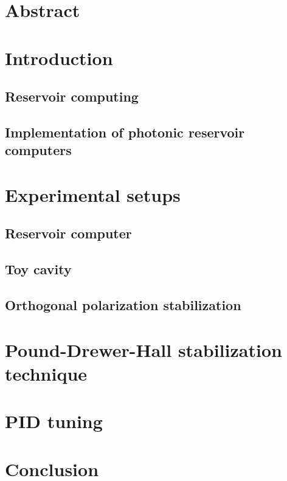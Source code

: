 









\chapter*{Abstract}

\tableofcontents
\listoffigures

\chapter{Introduction}

\section{Reservoir computing}

\section{Implementation of photonic reservoir computers}

\chapter{Experimental setups}

\section{Reservoir computer}

\section{Toy cavity}

\section{Orthogonal polarization stabilization}

\chapter{Pound-Drewer-Hall stabilization technique}

\chapter{PID tuning}

\chapter{Conclusion}


\printbibliography
	

